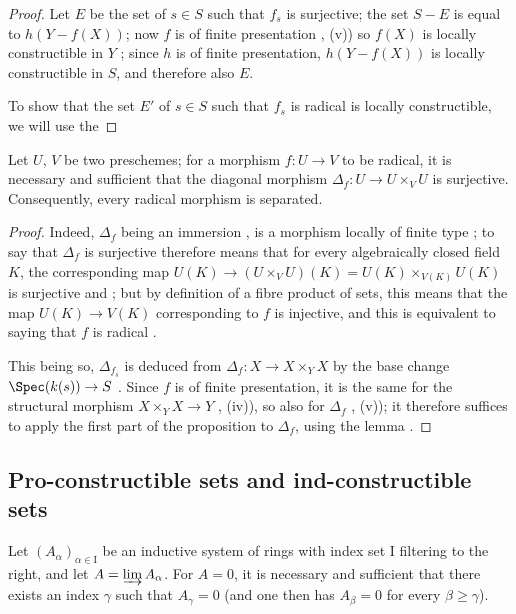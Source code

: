 \begin{proof}
Let $E$ be the set of $s\in S$ such that $f_s$ is surjective; the set $S-E$ is equal to $h(Y-f(X))$; now $f$ is of finite presentation , (v)) so $f(X)$ is locally constructible in $Y$ ; since $h$ is of finite presentation, $h(Y-f(X))$ is locally constructible in $S$, and therefore also $E$.

To show that the set $E'$ of $s\in S$ such that $f_s$ is radical is locally constructible, we will use the
\end{proof}

\begin{lemma}[1.8.7.1]
\label{IV.1.8.7.1}
Let $U$, $V$ be two preschemes; for a morphism $f:U\to V$ to be radical, it is necessary and sufficient that the diagonal morphism $\Delta_f:U\to U\times_V U$ is surjective.
Consequently, every radical morphism is separated.
\end{lemma}

\begin{proof}
Indeed, $\Delta_f$ being an immersion , is a morphism locally of finite type ; to say that $\Delta_f$ is surjective therefore means that for every algebraically closed field $K$, the corresponding map $U(K)\to(U\times_V U)(K)=U(K)\times_{V(K)} U(K)$ is surjective  and ; but by definition of a fibre product of sets, this means that the map $U(K)\to V(K)$ corresponding to $f$ is injective, and this is equivalent to saying that $f$ is radical .

This being so, $\Delta_{f_s}$ is deduced from $\Delta_f:X\to X\times_Y X$ by the base change $\Spec(k(s))\to S$ .
Since $f$ is of finite presentation, it is the same for the structural morphism $X\times_Y X\to Y$ , (iv)), so also for $\Delta_f$ , (v)); it therefore suffices to apply the first part of the proposition to $\Delta_f$, using the lemma .
\end{proof}


\subsection{Pro-constructible sets and ind-constructible sets}
\label{subsection:IV.1.9}

\begin{lemma}[1.9.1]
\label{IV.1.9.1}
Let $(A_\alpha)_{\alpha\in\mathrm{I}}$ be an inductive system of rings with index set $\mathrm{I}$ filtering to the right, and let $A=\varinjlim A_\alpha$.
For $A=0$, it is necessary and sufficient that there exists an index $\gamma$ such that $A_\gamma=0$ (and one then has $A_\beta=0$ for every $\beta\geq\gamma$).
\end{lemma}

